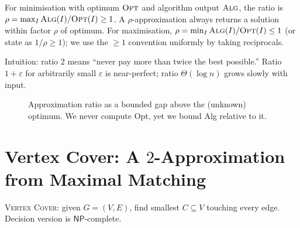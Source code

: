 \begin{definition}
For minimisation with optimum $\textsc{Opt}$ and algorithm output $\textsc{Alg}$, the ratio is $\rho=\max_{I}\textsc{Alg}(I)/\textsc{Opt}(I)\ge 1$. A $\rho$-approximation always returns a solution within factor $\rho$ of optimum. For maximisation, $\rho=\min_{I}\textsc{Alg}(I)/\textsc{Opt}(I)\le 1$ (or state as $1/\rho\ge 1$); we use the $\ge 1$ convention uniformly by taking reciprocals.
\end{definition}

Intuition: ratio $2$ means ``never pay more than twice the best possible.'' Ratio $1+\varepsilon$ for arbitrarily small $\varepsilon$ is near-perfect; ratio $\Theta(\log n)$ grows slowly with input.

\begin{figure}[h]\centering
{}
\caption{Approximation ratio as a bounded gap above the (unknown) optimum. We never compute Opt, yet we bound Alg relative to it.}
\label{fig:approx-ratio}
\end{figure}

\section{\texorpdfstring{Vertex Cover: A $2$-Approximation from Maximal Matching}{Vertex Cover: A 2-Approximation from Maximal Matching}}
\label{sec:vertex-cover}

\textsc{Vertex Cover}: given $G=(V,E)$, find smallest $C\subseteq V$ touching every edge. Decision version is $\mathsf{NP}$-complete.

